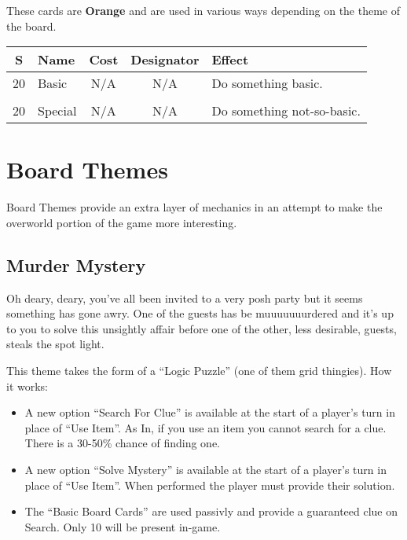 \documentclass{article}
\begin{document}
These cards are \textbf{Orange} and are used in various ways depending on the
theme of the board.
\vspace*{2ex}

\begin{tabular}{clccl}
\textbf{S} & \textbf{Name} & \textbf{Cost} & \textbf{Designator} & \textbf{Effect} \\
\hline
20 & Basic & N/A & N/A & Do something basic. \\
&&&& \\
20 & Special & N/A & N/A & Do something not-so-basic. \\
\end{tabular}


\section{Board Themes}

Board Themes provide an extra layer of mechanics in an attempt to make the overworld
portion of the game more interesting.

\subsection{Murder Mystery}

Oh deary, deary, you've all been invited to a very posh party but it seems something
has gone awry.  One of the guests has be muuuuuuurdered and it's up to you to solve
this unsightly affair before one of the other, less desirable, guests, steals the
spot light.
\vspace*{2ex}


\noindent
This theme takes the form of a ``Logic Puzzle'' (one of them grid thingies).  How it
works:

\begin{itemize}
\item A new option ``Search For Clue'' is available at the start of a player's turn
in place of ``Use Item''.  As In, if you use an item you cannot search for a clue.
There is a 30-50\% chance of finding one.

\item A new option ``Solve Mystery'' is available at the start of a player's turn
in place of ``Use Item''.  When performed the player must provide their solution.

\item The ``Basic Board Cards'' are used passivly and provide a guaranteed clue
on Search. Only 10 will be present in-game. %

\end{itemize}
\end{document}
